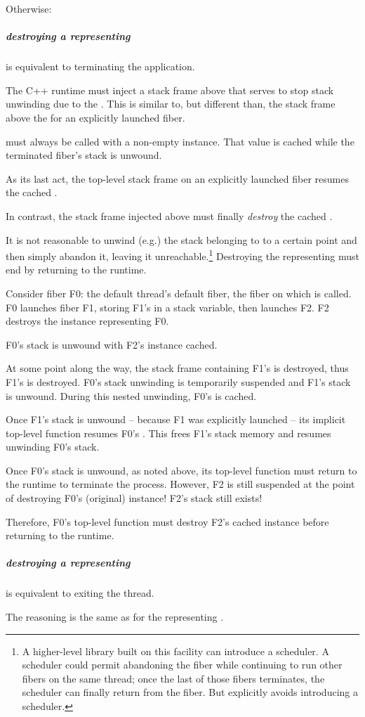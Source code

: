 Otherwise:

\subparagraph{destroying a \fiber representing \main}\label{destroymain} is equivalent to terminating the application.

The C++ runtime must inject a stack frame above \main that serves to stop
stack unwinding due to the \foreignex. This is similar to, but different than,
the stack frame above the \entryfn for an explicitly launched fiber.

\unwindfib must always be called with a non-empty \fiber instance. That \fiber
value is cached while the terminated fiber's stack is unwound.

As its last act, the top-level stack frame on an explicitly launched fiber
resumes the cached \fiber.

In contrast, the stack frame injected above \main must finally \emph{destroy}
the cached \fiber.

It is not reasonable to unwind (e.g.) the stack belonging to \main to a
certain point and then simply abandon it, leaving it unreachable.\footnote{A
higher-level library built on this facility can introduce a scheduler. A
scheduler could permit abandoning the \main fiber while continuing to run
other fibers on the same thread; once the last of those fibers terminates, the
scheduler can finally return from the \main fiber. But \fiber explicitly
avoids introducing a scheduler.} Destroying the \fiber representing \main must
end by returning to the runtime.

Consider fiber F0: the default thread's default fiber, the fiber on
which \main is called. F0 launches fiber F1, storing F1's \fiber in a
stack variable, then launches F2. F2 destroys the \fiber instance representing
F0.

F0's stack is unwound with F2's \fiber instance cached.

At some point along the way, the stack frame containing F1's \fiber is
destroyed, thus F1's \fiber is destroyed. F0's stack unwinding is temporarily
suspended and F1's stack is unwound. During this nested unwinding, F0's \fiber
is cached.

Once F1's stack is unwound -- because F1 was explicitly launched -- its
implicit top-level function resumes F0's \fiber. This frees F1's stack memory
and resumes unwinding F0's stack.

Once F0's stack is unwound, as noted above, its top-level function must return
to the runtime to terminate the process. However, F2 is still suspended at the
point of destroying F0's (original) \fiber instance! F2's stack still exists!

Therefore, F0's top-level function must destroy F2's cached \fiber instance
before returning to the runtime.

\subparagraph{destroying a \fiber representing } is
equivalent to exiting the thread.

The reasoning is the same as for the \fiber representing \main.


